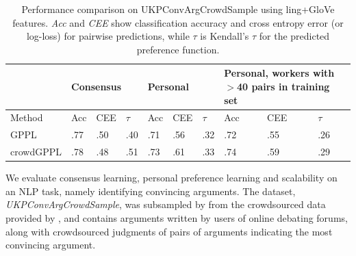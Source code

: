 \begin{table}
\small
\begin{tabularx}{\columnwidth}{ | l | X | X | X | X | X | X | X | X | X |}
\hline
 & \multicolumn{3}{l|}{Consensus}&\multicolumn{3}{l|}{Personal} &\multicolumn{3}{p{3.1cm}|}{Personal, workers with $>$40 pairs in training set} \\ \hline
 Method & Acc & CEE & $\tau$ & Acc & CEE & $\tau$ & Acc & CEE & $\tau$ \\ \hline
 GPPL %
  & .77 & .50 & .40 & .71 & .56 & .32 & .72 & .55 & .26 \\ %
 crowdGPPL %
 & .78 & .48 & .51 & .73 & .61 & .33 & .74 & .59 & .29  %
 \\\hline
\end{tabularx}
\caption{Performance comparison on UKPConvArgCrowdSample using ling+GloVe features. \emph{Acc} and \emph{CEE} show classification accuracy and cross entropy error (or log-loss) for pairwise predictions, 
while $\tau$ is Kendall's $\tau$ for the predicted preference function. }
\label{tab:convarg}
\end{table}
We evaluate consensus learning, personal preference learning and scalability
on an NLP task, namely identifying convincing arguments. 
The dataset, \emph{UKPConvArgCrowdSample}, was subsampled by \citet{simpson2018finding}
from the crowdsourced data provided by \citet{habernal2016argument}, and
contains arguments written by users
of online debating forums,
along with crowdsourced judgments of pairs of arguments
 indicating the most convincing argument.
